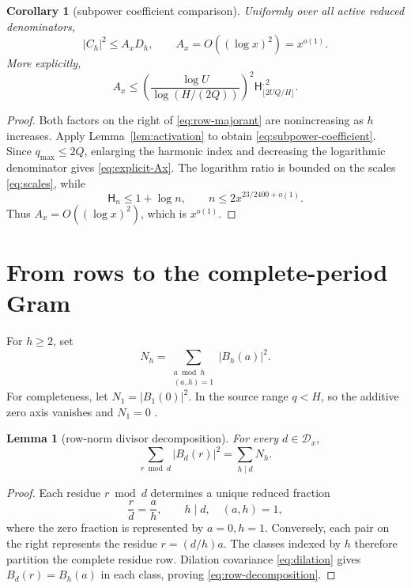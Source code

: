 \documentclass[11pt]{article}
\newtheorem{lemma}[theorem]{Lemma}
\newtheorem{corollary}[theorem]{Corollary}
\theoremstyle{definition}
\theoremstyle{remark}
\newcommand{\Dd}{\mathcal D}
\newcommand{\Harm}{\mathsf H}
\begin{document}
\begin{corollary}[subpower coefficient comparison]
\label{cor:subpower}
Uniformly over all active reduced denominators,
\begin{equation}
 |C_h|^2\le A_xD_h,
 \qquad A_x=O((\log x)^2)=x^{o(1)}.
 \label{eq:subpower-coefficient}
\end{equation}
More explicitly,
\begin{equation}
 A_x\le
 \left(\frac{\log U}{\log(H/(2Q))}\right)^2
 \Harm_{\lfloor2UQ/H\rfloor}^{,2}.
 \label{eq:explicit-Ax}
\end{equation}
\end{corollary}

\begin{proof}
Both factors on the right of \eqref{eq:row-majorant} are nonincreasing as $h$
increases.  Apply Lemma~\ref{lem:activation} to obtain
\eqref{eq:subpower-coefficient}.  Since $q_{\max}\le2Q$, enlarging the
harmonic index and decreasing the logarithmic denominator gives
\eqref{eq:explicit-Ax}.  The logarithm ratio is bounded on the scales
\eqref{eq:scales}, while
\[
 \Harm_n\le1+\log n,
 \qquad n\le2x^{23/2400+o(1)}.
\]
Thus $A_x=O((\log x)^2)$, which is $x^{o(1)}$.
\end{proof}

\section{From rows to the complete-period Gram}

For $h\ge2$, set
\begin{equation}
 N_h=\sum_{\substack{a\bmod h\\(a,h)=1}}|B_h(a)|^2.
 \label{eq:primitive-norm}
\end{equation}
For completeness, let $N_1=|B_1(0)|^2$.  In the source range $q<H$, so the
additive zero axis vanishes and $N_1=0$ \cite{WangTPC214}.

\begin{lemma}[row-norm divisor decomposition]
\label{lem:row-decomposition}
For every $d\in\Dd_x$,
\begin{equation}
 \sum_{r\bmod d}|B_d(r)|^2=\sum_{h\mid d}N_h.
 \label{eq:row-decomposition}
\end{equation}
\end{lemma}

\begin{proof}
Each residue $r\bmod d$ determines a unique reduced fraction
\[
 \frac rd=\frac ah,
 \qquad h\mid d,\quad (a,h)=1,
\]
where the zero fraction is represented by $a=0,h=1$.  Conversely, each pair
on the right represents the residue $r=(d/h)a$.  The classes indexed by $h$
therefore partition the complete residue row.  Dilation covariance
\eqref{eq:dilation} gives $B_d(r)=B_h(a)$ in each class, proving
\eqref{eq:row-decomposition}.
\end{proof}
\end{document}
